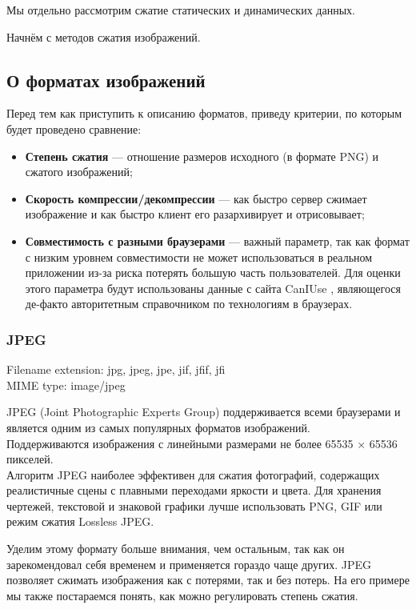 \documentclass[12pt]{article}
\begin{document}
Мы отдельно рассмотрим сжатие статических и динамических данных.

Начнём с методов сжатия изображений.

\subsection{О форматах изображений}

Перед тем как приступить к описанию форматов, приведу критерии, по которым будет проведено сравнение:

\begin{itemize}
    \item \textbf{Степень сжатия} — отношение размеров исходного (в формате PNG) и сжатого изображений;
    \item \textbf{Скорость компрессии/декомпрессии} — как быстро сервер сжимает изображение и как быстро клиент его разархивирует и отрисовывает;
    \item \textbf{Совместимость с разными браузерами} — важный параметр,
          так как формат с низким уровнем совместимости не может использоваться в реальном приложении
          из-за риска потерять большую часть пользователей. Для оценки этого параметра
          будут использованы данные с сайта CanIUse \cite{caniuse}, являющегося де-факто авторитетным справочником
          по технологиям в браузерах.
\end{itemize}

\subsubsection{JPEG}

Filename extension: jpg, jpeg, jpe, jif, jfif, jfi\\
MIME type: image/jpeg

JPEG (Joint Photographic Experts Group) поддерживается всеми браузерами
и является одним из самых популярных форматов изображений.\\
Поддерживаются изображения с линейными размерами не более 65535 × 65536 пикселей.\\

Алгоритм JPEG наиболее эффективен для сжатия фотографий, содержащих реалистичные сцены
с плавными переходами яркости и цвета. Для хранения чертежей, текстовой и знаковой
графики лучше использовать PNG, GIF
или режим сжатия Lossless JPEG.

Уделим этому формату больше внимания, чем остальным, так как он зарекомендовал себя временем
и применяется гораздо чаще других. JPEG позволяет сжимать изображения как с потерями,
так и без потерь.
На его примере мы также постараемся понять, как можно регулировать степень сжатия.
\end{document}
